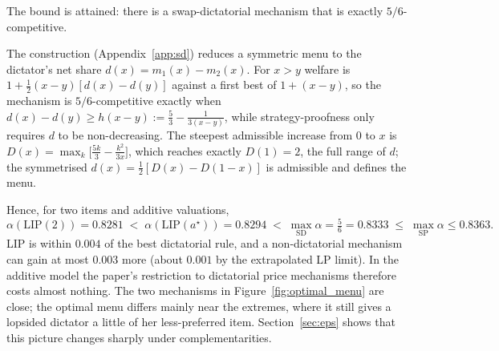 \begin{theorem}[C]\label{thm:C}
The bound is attained: there is a swap-dictatorial mechanism that is exactly $5/6$-competitive.
\end{theorem}
\noindent The construction (Appendix~\ref{app:sd}) reduces a symmetric menu to the dictator's net
share $d(x)=m_1(x)-m_2(x)$. For $x>y$ welfare is $1+\tfrac12(x-y)[d(x)-d(y)]$ against a first best of
$1+(x-y)$, so the mechanism is $5/6$-competitive exactly when
$d(x)-d(y)\ge h(x-y):=\tfrac53-\tfrac{1}{3(x-y)}$, while strategy-proofness only requires $d$ to be
non-decreasing. The steepest admissible increase from $0$ to $x$ is
$D(x)=\max_k\big[\tfrac{5k}{3}-\tfrac{k^2}{3x}\big]$, which reaches exactly $D(1)=2$, the full range
of $d$; the symmetrised $d(x)=\tfrac12[D(x)-D(1-x)]$ is admissible and defines the menu.

Hence, for two items and additive valuations,
\[
\alpha(\mathrm{LIP}(2))=0.8281\;<\;\alpha(\mathrm{LIP}(a^\star))=0.8294\;<\;\max_{\mathrm{SD}}\alpha=\tfrac56=0.8333\;\le\;\max_{\mathrm{SP}}\alpha\le0.8363 .
\]
LIP is within $0.004$ of the best dictatorial rule, and a non-dictatorial mechanism can gain at
most $0.003$ more (about $0.001$ by the extrapolated LP limit). In the additive model the paper's
restriction to dictatorial price mechanisms therefore costs almost nothing. The two mechanisms
in Figure~\ref{fig:optimal_menu} are close; the optimal menu differs mainly near the extremes,
where it still gives a lopsided dictator a little of her less-preferred item. Section~\ref{sec:eps}
shows that this picture changes sharply under complementarities.
